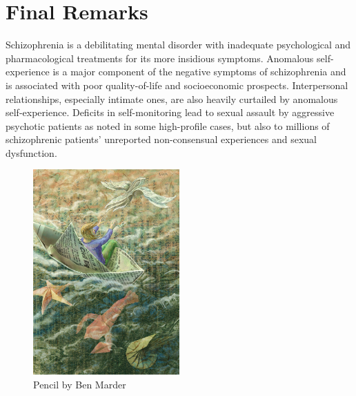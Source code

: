 \documentclass[]{article}
\begin{document}
\section{Final Remarks}

	Schizophrenia is a debilitating mental disorder with inadequate psychological and pharmacological treatments for its more insidious symptoms. Anomalous self-experience is a major component of the negative symptoms of schizophrenia and is associated with poor quality-of-life and socioeconomic prospects. Interpersonal relationships, especially intimate ones, are also heavily curtailed by anomalous self-experience. Deficits in self-monitoring lead to sexual assault by aggressive psychotic patients as noted in some high-profile cases, but also to millions of schizophrenic patients’ unreported non-consensual experiences and sexual dysfunction.
	
	\begin{figure}
		\centering
		\includegraphics[width=0.5\textwidth]{graphics/BenMarder3}
		\caption{Pencil by Ben Marder}
	\end{figure}

	\medskip
	\FloatBarrier
	\printbibliography
	
\end{document}
